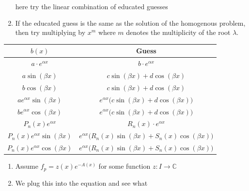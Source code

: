 \documentclass[10pt]{article}
\newcommand{\C}{{\mathbb C}}
\newcommand{\ra}{{\rightarrow}}
\begin{document}
\begin{multicols*}{3}
\begin{enumerate}[label=(\arabic*)]
          here try the linear combination of educated guesses
    \item If the educated guess is the same as the solution
          of the homogenous problem, then try multiplying by $x^m$
          where $m$ denotes the multiplicity of the root $\lambda$.
  \end{enumerate}
  \begin{center}
    \begin{tabular}{|c|c|}
      \hline
      $b(x)$                              & Guess                                                                  \\ \hline
      $a \cdot e^{\alpha x}$              & $b \cdot e^{\alpha x}$                                                 \\ \hline
      $a \sin(\beta x)$                   & $c \sin(\beta x) + d \cos(\beta x)$                                    \\ \hline
      $b \cos(\beta x)$                   & $c \sin(\beta x) + d \cos(\beta x)$                                    \\ \hline
      $a e^{\alpha x} \sin(\beta x)$      & $e^{\alpha x} \Big( c \sin(\beta x) + d \cos(\beta x) \Big)$           \\ \hline
      $b e^{\alpha x} \cos(\beta x)$      & $e^{\alpha x} \Big( c \sin(\beta x) + d \cos(\beta x) \Big)$           \\ \hline
      $P_n(x) e^{\alpha x}$               & $R_n(x) \cdot e^{\alpha x}$                                            \\ \hline
      $P_n(x) e^{\alpha x} \sin(\beta x)$ & $e^{\alpha x} \Big( R_n(x) \sin(\beta x) + S_n(x) \cos(\beta x) \Big)$ \\ \hline
      $P_n(x) e^{\alpha x} \cos(\beta x)$ & $e^{\alpha x} \Big( R_n(x) \sin(\beta x) + S_n(x) \cos(\beta x) \Big)$ \\ \hline
    \end{tabular}
  \end{center}
  \begin{enumerate}[label=(\arabic*)]
    \item Assume $f_p = z(x) e^{-A(x)}$ for some function
          $z: I \ra \C$
    \item We plug this into the equation and see what

\end{enumerate}
\end{multicols*}
\end{document}
